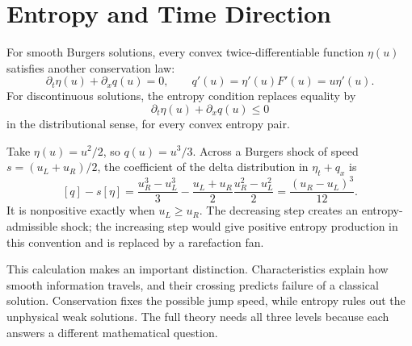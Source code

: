 \section{Entropy and Time Direction}

For smooth Burgers solutions, every convex twice-differentiable function \(\eta(u)\) satisfies another conservation law:
\[
 \partial_t\eta(u)+\partial_xq(u)=0,
 \qquad q'(u)=\eta'(u)F'(u)=u\eta'(u).
\]
For discontinuous solutions, the entropy condition replaces equality by
\[
 \boxed{\partial_t\eta(u)+\partial_xq(u)\le0}
\]
in the distributional sense, for every convex entropy pair.

Take \(\eta(u)=u^2/2\), so \(q(u)=u^3/3\). Across a Burgers shock of speed \(s=(u_L+u_R)/2\), the coefficient of the delta distribution in \(\eta_t+q_x\) is
\[
 [q]-s[\eta]
 =\frac{u_R^3-u_L^3}{3}
  -\frac{u_L+u_R}{2}\frac{u_R^2-u_L^2}{2}
 =\frac{(u_R-u_L)^3}{12}.
\]
It is nonpositive exactly when \(u_L\ge u_R\). The decreasing step creates an entropy-admissible shock; the increasing step would give positive entropy production in this convention and is replaced by a rarefaction fan.

This calculation makes an important distinction. Characteristics explain how smooth information travels, and their crossing predicts failure of a classical solution. Conservation fixes the possible jump speed, while entropy rules out the unphysical weak solutions. The full theory needs all three levels because each answers a different mathematical question.
